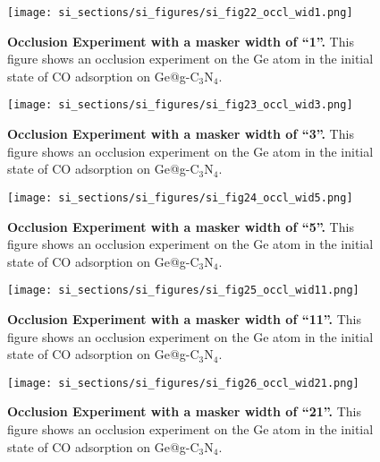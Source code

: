 \begin{figure}
  \centering
  \texttt{[image: si\_sections/si\_figures/si\_fig22\_occl\_wid1.png]}
  \caption{\textbf{Occlusion Experiment with a masker width of “1”.}
  This figure shows an occlusion experiment on the Ge atom in
  the initial state of CO adsorption on Ge@g-C$_3$N$_4$.}
  \label{si_fig22:occl_wid1}
\end{figure}


\begin{figure}
  \centering
  \texttt{[image: si\_sections/si\_figures/si\_fig23\_occl\_wid3.png]}
  \caption{\textbf{Occlusion Experiment with a masker width of “3”.}
  This figure shows an occlusion experiment on the Ge atom in
  the initial state of CO adsorption on Ge@g-C$_3$N$_4$.}
  \label{si_fig23:occl_wid3}
\end{figure}


\begin{figure}
  \centering
  \texttt{[image: si\_sections/si\_figures/si\_fig24\_occl\_wid5.png]}
  \caption{\textbf{Occlusion Experiment with a masker width of “5”.}
  This figure shows an occlusion experiment on the Ge atom in
  the initial state of CO adsorption on Ge@g-C$_3$N$_4$.}
  \label{si_fig24:occl_wid5}
\end{figure}


\begin{figure}
  \centering
  \texttt{[image: si\_sections/si\_figures/si\_fig25\_occl\_wid11.png]}
  \caption{\textbf{Occlusion Experiment with a masker width of “11”.}
  This figure shows an occlusion experiment on the Ge atom in
  the initial state of CO adsorption on Ge@g-C$_3$N$_4$.}
  \label{si_fig25:occl_wid11}
\end{figure}


\begin{figure}
  \centering
  \texttt{[image: si\_sections/si\_figures/si\_fig26\_occl\_wid21.png]}
  \caption{\textbf{Occlusion Experiment with a masker width of “21”.}
  This figure shows an occlusion experiment on the Ge atom in
  the initial state of CO adsorption on Ge@g-C$_3$N$_4$.}
  \label{si_fig26:occl_wid21}
\end{figure}



